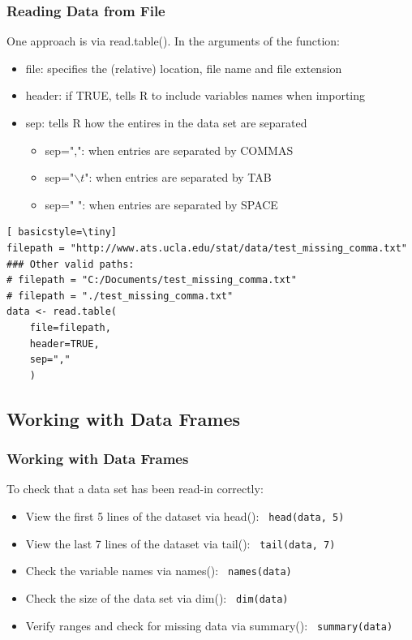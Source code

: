 \begin{frame}
 \frametitle{Reading Data from File}

One approach is via \ttfamily read.table(). \normalfont  In the arguments of the function:
  \begin{itemize}
  \item \ttfamily file: \normalfont specifies the (relative) location, file name and file extension
  \item \ttfamily header: \normalfont if TRUE, tells R to include variables names when importing
  \item \ttfamily sep: \normalfont tells R how the entires in the data set are separated
    \begin{itemize}
      \item \ttfamily sep=",": \normalfont when entries are separated by COMMAS
      \item \ttfamily sep="$\backslash t$": \normalfont when entries are separated by TAB
      \item \ttfamily sep=" ": \normalfont when entries are separated by SPACE
    \end{itemize}
   \end{itemize}

\newpage   
   	\begin{lstlisting}[ basicstyle=\tiny]
filepath = "http://www.ats.ucla.edu/stat/data/test_missing_comma.txt"
### Other valid paths:
# filepath = "C:/Documents/test_missing_comma.txt"
# filepath = "./test_missing_comma.txt"
data <- read.table(
	file=filepath, 
	header=TRUE, 
	sep=","
	)
	\end{lstlisting}
\normalfont
\normalsize
\end{frame}

\subsection{Working with Data Frames}
\begin{frame}
	\frametitle{Working with Data Frames}
	To check that a data set has been read-in correctly: 
	\begin{itemize}
		\item View the first 5 lines of the dataset via \ttfamily head(): \normalfont \lstinline$ head(data, 5) $
		\item View the last 7 lines of the dataset via \ttfamily tail(): \normalfont \lstinline$ tail(data, 7) $
		\item Check the variable names via \ttfamily names(): \normalfont \lstinline$ names(data) $
		\item Check the size of the data set via \ttfamily dim(): \normalfont \lstinline$ dim(data) $
		\item Verify ranges and check for missing data via \ttfamily summary(): \normalfont \lstinline$ summary(data) $
	\end{itemize}
\end{frame}



